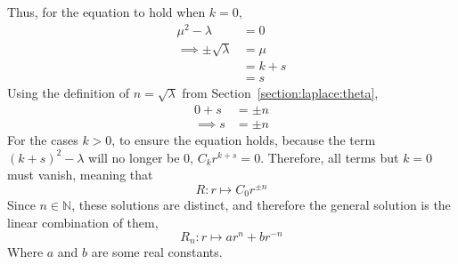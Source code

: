 Thus, for the equation to hold when $k=0$,
\begin{align*}
    \mu^2-\lambda&=0\\
    \implies\pm\sqrt{\lambda}&=\mu\\
    &=k+s\\
    &=s
\end{align*}
Using the definition of $n=\sqrt{\lambda}$ from Section~\ref{section:laplace:theta},
\begin{align*}
    0+s&=\pm n\\
    \implies s&=\pm n
\end{align*}
For the cases $k>0$, to ensure the equation holds, because the term $(k+s)^2-\lambda$ will no longer be $0$, $C_k r^{k+s}=0$. Therefore, all terms but $k=0$ must vanish, meaning that
$$
    R:r\mapsto C_0r^{\pm n}
$$
Since $n\in\mathbb{N}$, these solutions are distinct, and therefore the general solution is the linear combination of them,
\begin{equation}\label{equation:laplace-equation:8}
    R_n:r\mapsto ar^n+br^{-n}
\end{equation}
Where $a$ and $b$ are some real constants.

